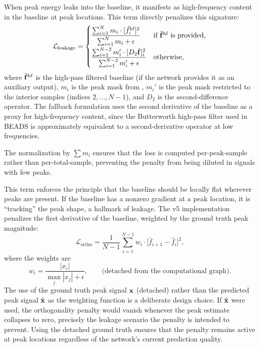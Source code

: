 When peak energy leaks into the baseline, it manifests as high-frequency content in the baseline at peak locations. This term directly penalizes this signature:
\begin{equation}
    \mathcal{L}_{\text{leakage}} =
    \begin{cases}
        \displaystyle\frac{\sum_{i=1}^{N} m_i \cdot [\hat{f}_i^{\text{hf}}]^2}{\sum_{i=1}^{N} m_i + \epsilon} & \text{if } \hat{\mathbf{f}}^{\text{hf}} \text{ is provided,} \\[10pt]
        \displaystyle\frac{\sum_{i=1}^{N-2} m_i' \cdot [D_2 \hat{\mathbf{f}}]_i^2}{\sum_{i=1}^{N-2} m_i' + \epsilon} & \text{otherwise,}
    \end{cases}
    \label{eq:leakage_loss}
\end{equation}
where $\hat{\mathbf{f}}^{\text{hf}}$ is the high-pass filtered baseline (if the network provides it as an auxiliary output), $m_i$ is the peak mask from , $m_i'$ is the peak mask restricted to the interior samples (indices $2, \ldots, N-1$), and $D_2$ is the second-difference operator. The fallback formulation uses the second derivative of the baseline as a proxy for high-frequency content, since the Butterworth high-pass filter used in BEADS is approximately equivalent to a second-derivative operator at low frequencies.

The normalization by $\sum m_i$ ensures that the loss is computed per-peak-sample rather than per-total-sample, preventing the penalty from being diluted in signals with few peaks.

This term enforces the principle that the baseline should be locally flat wherever peaks are present. If the baseline has a nonzero gradient at a peak location, it is ``tracking'' the peak shape, a hallmark of leakage. The v5 implementation penalizes the first derivative of the baseline, weighted by the ground truth peak magnitude:
\begin{equation}
    \mathcal{L}_{\text{ortho}} = \frac{1}{N-1} \sum_{i=1}^{N-1} w_i \cdot \big[\hat{f}_{i+1} - \hat{f}_i\big]^2,
    \label{eq:ortho_loss}
\end{equation}
where the weights are
\begin{equation}
    w_i = \frac{|x_i|}{\max_j |x_j| + \epsilon}, \qquad \text{(detached from the computational graph)}.
    \label{eq:ortho_weights}
\end{equation}
The use of the ground truth peak signal $\mathbf{x}$ (detached) rather than the predicted peak signal $\hat{\mathbf{x}}$ as the weighting function is a deliberate design choice. If $\hat{\mathbf{x}}$ were used, the orthogonality penalty would vanish whenever the peak estimate collapses to zero, precisely the leakage scenario the penalty is intended to prevent. Using the detached ground truth ensures that the penalty remains active at peak locations regardless of the network's current prediction quality.

